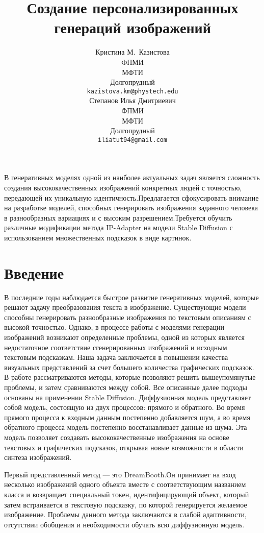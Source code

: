 \documentclass{article}
\title{Создание персонализированных генераций изображений}
\author{ Кристина М.~Казистова \\
	ФПМИ\\
	МФТИ\\
	Долгопрудный \\
	\texttt{kazistova.km@phystech.edu} \\
	\And
	Степанов Илья Дмитриевич \\
	ФПМИ\\
	МФТИ\\
	Долгопрудный \\
	\texttt{iliatut94@gmail.com} \\
}
\date{}
\begin{document}
\maketitle

\begin{Аннотация}
        В генеративных моделях одной из наиболее актуальных задач является сложность создания высококачественных изображений конкретных людей с точностью, передающей их уникальную идентичность.Предлагается сфокусировать внимание на разработке моделей, способных генерировать изображения заданного человека в разнообразных вариациях и с высоким разрешением.Требуется обучить различные модификации метода IP-Adapter на модели Stable Diffusion с использованием множественных подсказок в виде картинок.
\end{Аннотация}



\section{Введение}В последние годы наблюдается быстрое развитие генеративных моделей, которые решают задачу преобразования текста в изображение. Существующие модели способны генерировать разнообразные изображения по текстовым описаниям с высокой точностью. Однако, в процессе работы с моделями генерации изображений возникают определенные проблемы, одной из которых является недостаточное соответствие сгенерированных изображений и исходным текстовым подсказкам. Наша задача заключается в повышении качества визуальных представлений за счет большего количества графических подсказок. В работе рассматриваются методы, которые позволяют решить вышеупомянутые проблемы, и затем сравниваются между собой. Все описанные далее подходы основаны на применении Stable Diffusion\cite{2}. Диффузионная модель представляет собой модель, состоящую из двух процессов: прямого и обратного. Во время прямого процесса к входным данным постепенно добавляется шум, а во время обратного процесса модель постепенно восстанавливает данные из шума. Эта модель позволяет создавать высококачественные изображения на основе текстовых и графических подсказок, открывая новые возможности в области синтеза изображений.

Первый представленный метод --- это DreamBooth\cite{3}.Он принимает на вход несколько изображений одного объекта вместе с соответствующим названием класса и возвращает специальный токен, идентифицирующий объект, который затем встраивается в текстовую подсказку, по которой генерируется желаемое изображение. Проблемы данного метода заключаются в слабой адаптивности, отсутствии обобщения и необходимости обучать всю диффузионную модель. 
\end{document}
